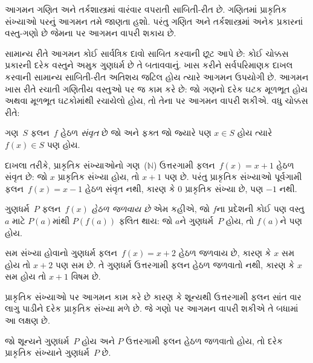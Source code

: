 \documentclass[../../../include/open-logic-section]{subfiles}
\begin{document}


\begin{explain}
આગમન ગણિત અને તર્કશાસ્ત્રમાં વારંવાર વપરાતી સાબિતી-રીત છે.
ગણિતમાં પ્રાકૃતિક સંખ્યાઓ પરનું આગમન તમે જાણતા હશો.
પરંતુ ગણિત અને તર્કશાસ્ત્રમાં અનેક પ્રકારનાં વસ્તુ-ગણો છે
જેમના પર આગમન વાપરી શકાય છે.

સામાન્ય રીતે આગમન કોઈ સાર્વત્રિક દાવો સાબિત કરવાની છૂટ આપે છે:
કોઈ ચોક્કસ પ્રકારની દરેક વસ્તુને અમુક ગુણધર્મ છે તે બતાવવાનું.
ખાસ કરીને સર્વપરિમાણક દાખલ કરવાની સામાન્ય સાબિતી-રીત
અતિશય જટિલ હોય ત્યારે આગમન ઉપયોગી છે.
આગમન ખાસ રીતે રચાતી ગણિતીય વસ્તુઓ પર જ કામ કરે છે:
જો ગણનો દરેક ઘટક મૂળભૂત હોય અથવા મૂળભૂત ઘટકોમાંથી
રચાયેલો હોય, તો તેના પર આગમન વાપરી શકીએ.
વધુ ચોક્કસ રીતે:
\end{explain}

\begin{defn}
ગણ~$S$ ફલન~$f$ હેઠળ \emph{સંવૃત} છે જો અને ફક્ત જો
જ્યારે પણ $x \in S$ હોય ત્યારે $f(x) \in S$ પણ હોય.
\end{defn}

\begin{explain}
દાખલા તરીકે, પ્રાકૃતિક સંખ્યાઓનો ગણ~($\mathbb{N}$)
ઉત્તરગામી ફલન~$f(x) = x+1$ હેઠળ સંવૃત છે:
જો $x$ પ્રાકૃતિક સંખ્યા હોય, તો $x+1$ પણ છે.
પરંતુ પ્રાકૃતિક સંખ્યાઓ પૂર્વગામી ફલન~$f(x) = x-1$
હેઠળ સંવૃત નથી, કારણ કે $0$ પ્રાકૃતિક સંખ્યા છે, પણ $-1$ નથી.
\end{explain}

\begin{defn}
ગુણધર્મ~$P$ ફલન~$f(x)$ \emph{હેઠળ જળવાય છે} એમ કહીએ,
જો $f$ના પ્રદેશની કોઈ પણ વસ્તુ~$a$ માટે
$P(a)$માંથી $P(f(a))$ ફલિત થાય:
જો $a$ને ગુણધર્મ~$P$ હોય, તો $f(a)$ને પણ હોય.
\end{defn}

\begin{explain}
સમ સંખ્યા હોવાનો ગુણધર્મ ફલન~$f(x) = x+2$ હેઠળ જળવાય છે,
કારણ કે $x$ સમ હોય તો $x+2$ પણ સમ છે.
તે ગુણધર્મ ઉત્તરગામી ફલન હેઠળ જળવાતો નથી,
કારણ કે $x$ સમ હોય તો $x+1$ વિષમ છે.

પ્રાકૃતિક સંખ્યાઓ પર આગમન કામ કરે છે કારણ કે શૂન્યથી
ઉત્તરગામી ફલન સાંત વાર લાગુ પાડીને દરેક પ્રાકૃતિક સંખ્યા મળે છે.
જે ગણો પર આગમન વાપરી શકીએ તે બધામાં આ લક્ષણ છે.
\end{explain}

\begin{defn}
જો શૂન્યને ગુણધર્મ~$P$ હોય અને $P$ ઉત્તરગામી ફલન હેઠળ
જળવાતો હોય, તો દરેક પ્રાકૃતિક સંખ્યાને ગુણધર્મ~$P$ છે.
\end{defn}
\end{document}
